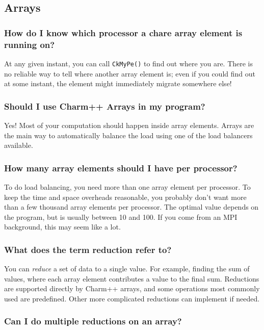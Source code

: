 \subsection{\charmpp{} Arrays}

\subsubsection{How do I know which processor a chare array element is running on?}

At any given instant, you can call {\tt CkMyPe()} to find out where
you are. There is no reliable way to tell where another array element is;
even if you could find out at some instant, the element might immediately
migrate somewhere else!

\subsubsection{Should I use Charm++ Arrays in my program?}

Yes! Most of your computation should happen inside array elements.
Arrays are the main way to automatically balance the load using one of the
load balancers available.

\subsubsection{How many array elements should I have per processor?}

To do load balancing, you need more than one array element per processor.
To keep the time and space overheads reasonable, you probably don't want
more than a few thousand array elements per processor. The optimal
value depends on the program, but is usually between 10 and 100.
If you come from an MPI background, this may seem like a lot.

\subsubsection{What does the term reduction refer to?}

You can {\em reduce} a set of data to a single value. For example,
finding the sum of values, where each array element contributes a value
to the final sum. Reductions are supported directly by Charm++ arrays, and some
operations most commonly used are predefined. Other more complicated reductions
can implement if needed.

\subsubsection{Can I do multiple reductions on an array?}

